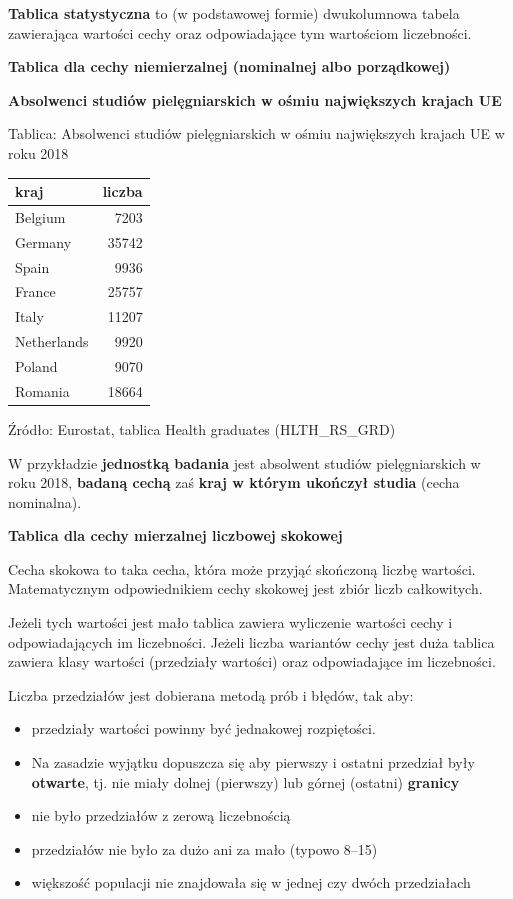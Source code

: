 \documentclass[
  openany]{book}
\begin{document}
\textbf{Tablica statystyczna} to (w podstawowej formie) dwukolumnowa tabela zawierająca
wartości cechy oraz odpowiadające tym wartościom liczebności.

\textbf{Tablica dla cechy niemierzalnej (nominalnej albo porządkowej)}

\begin{example}
\textbf{Absolwenci studiów pielęgniarskich w ośmiu największych krajach UE}

Tablica: Absolwenci studiów pielęgniarskich w ośmiu największych
krajach UE w roku 2018

\begin{tabular}{l|r}
\hline
kraj & liczba\\
\hline
Belgium & 7203\\
\hline
Germany & 35742\\
\hline
Spain & 9936\\
\hline
France & 25757\\
\hline
Italy & 11207\\
\hline
Netherlands & 9920\\
\hline
Poland & 9070\\
\hline
Romania & 18664\\
\hline
\end{tabular}

Źródło: Eurostat, tablica Health graduates (HLTH\_RS\_GRD)
\end{example}

W przykładzie \textbf{jednostką badania} jest absolwent studiów pielęgniarskich w roku 2018,
\textbf{badaną cechą} zaś \textbf{kraj w którym ukończył studia} (cecha nominalna).

\textbf{Tablica dla cechy mierzalnej liczbowej skokowej}

Cecha skokowa to taka cecha, która może przyjąć skończoną liczbę wartości.
Matematycznym odpowiednikiem cechy skokowej jest zbiór liczb całkowitych.

Jeżeli tych wartości jest mało tablica zawiera wyliczenie
wartości cechy i odpowiadających im liczebności. Jeżeli liczba wariantów
cechy jest duża tablica zawiera klasy wartości (przedziały wartości)
oraz odpowiadające im liczebności.

Liczba przedziałów jest dobierana metodą prób i błędów, tak aby:

\begin{itemize}
\item
  przedziały wartości powinny być jednakowej rozpiętości.
\item
  Na zasadzie wyjątku dopuszcza się aby pierwszy i ostatni przedział
  były \textbf{otwarte}, tj. nie miały dolnej (pierwszy) lub górnej (ostatni) \textbf{granicy}
\item
  nie było przedziałów z zerową liczebnością
\item
  przedziałów nie było za dużo ani za mało (typowo 8--15)
\item
  większość populacji nie znajdowała się w jednej czy dwóch przedziałach
\end{itemize}
\end{document}
